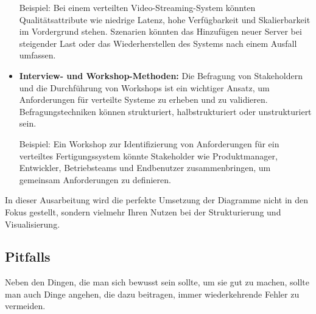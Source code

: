 \documentclass[../vs-script-first-v01.tex]{subfiles}
\begin{document}
\begin{itemize}
        Beispiel: Bei einem verteilten Video-Streaming-System könnten Qualitätsattribute wie niedrige Latenz, hohe Verfügbarkeit und Skalierbarkeit im Vordergrund stehen. Szenarien könnten das Hinzufügen neuer Server bei steigender Last oder das Wiederherstellen des Systems nach einem Ausfall umfassen.

  \item \textbf{Interview- und Workshop-Methoden:} Die Befragung von Stakeholdern und die Durchführung von Workshops ist ein wichtiger Ansatz, um Anforderungen für verteilte Systeme zu erheben und zu validieren. Befragungstechniken können strukturiert, halbstrukturiert oder unstrukturiert sein.

        Beispiel: Ein Workshop zur Identifizierung von Anforderungen für ein verteiltes Fertigungssystem könnte Stakeholder wie Produktmanager, Entwickler, Betriebsteams und Endbenutzer zusammenbringen, um gemeinsam Anforderungen zu definieren.
\end{itemize}

In dieser Ausarbeitung wird die perfekte Umsetzung der Diagramme nicht in den Fokus gestellt, sondern vielmehr Ihren Nutzen bei der Strukturierung und Visualisierung.

\subsection{Pitfalls}

Neben den Dingen, die man sich bewusst sein sollte, um sie gut zu machen, sollte man auch Dinge angehen, die dazu beitragen, immer wiederkehrende Fehler zu vermeiden.
\end{document}

